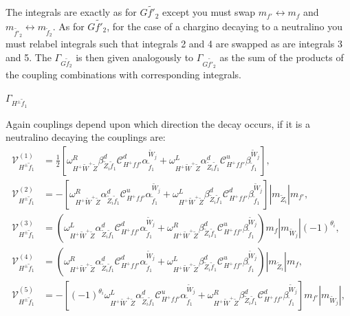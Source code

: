 \documentclass[final,3p,times,pdflatex]{elsarticle}
\begin{document}
The integrals are exactly as for $G \tilde{f'}_2$ except you must swap $m_{f'} \leftrightarrow m_{f}$ and $m_{\tilde{f'}_2} \leftrightarrow m_{\tilde{f}_2}$. As for $G \tilde{f'}_2$, for the case of a chargino decaying to a neutralino you must relabel integrals such that integrals 2 and 4 are swapped as are integrals 3 and 5.
The $\Gamma_{G \tilde{f}_2}$ is then given analogously to $\Gamma_{G \tilde{f'}_2}$ as the sum of the products of the coupling combinations with corresponding integrals.

\textbf{\underline{$\Gamma_{H^{\pm} \tilde{f}_1}$}}

Again couplings depend upon which direction the decay occurs, if it is a neutralino decaying the couplings are:
\begin{align}
\mathcal{V}_{H^{\pm} \tilde{f}_1}^{(1)} &= \frac{1}{2}[\omega_{H^+ \tilde{W}^+ \tilde{Z}}^R \beta_{\tilde{Z}_i \tilde{f}_1}^{d} \mathcal{C}_{H^+ f f'}^d \alpha_{\tilde{f}_1}^{\tilde{W}_j} + \omega_{H^+ \tilde{W}^+ \tilde{Z}}^L \alpha_{\tilde{Z}_i \tilde{f}_1}^{d} \mathcal{C}_{H^+ f f'}^u \beta_{\tilde{f}_1}^{\tilde{W}_j}], \\
\mathcal{V}_{H^{\pm} \tilde{f}_1}^{(2)} &= -[\omega_{H^+ \tilde{W}^+ \tilde{Z}}^R \alpha_{\tilde{Z}_i \tilde{f}_1}^{d} \mathcal{C}_{H^+ f f'}^u \alpha_{\tilde{f}_1}^{\tilde{W}_j} + \omega_{H^+ \tilde{W}^+ \tilde{Z}}^L \beta_{\tilde{Z}_i \tilde{f}_1}^{d} \mathcal{C}_{H^+ f f'}^d \beta_{\tilde{f}_1}^{\tilde{W}_j}]|m_{\tilde{Z}_i}|m_{f'}, \\
\mathcal{V}_{H^{\pm} \tilde{f}_1}^{(3)} &= (\omega_{H^+ \tilde{W}^+ \tilde{Z}}^L \alpha_{\tilde{Z}_i \tilde{f}_1}^{d}  \mathcal{C}_{H^+ f f'}^d \alpha_{\tilde{f}_1}^{\tilde{W}_j} + \omega_{H^+ \tilde{W}^+ \tilde{Z}}^R \beta_{\tilde{Z}_i \tilde{f}_1}^{d} \mathcal{C}_{H^+ f f'}^u \beta_{\tilde{f}_1}^{\tilde{W}_j})m_{f}|m_{\tilde{W}_j}|(-1)^{\theta_i}, \\
\mathcal{V}_{H^{\pm} \tilde{f}_1}^{(4)} &= (\omega_{H^+ \tilde{W}^+ \tilde{Z}}^R \alpha_{\tilde{Z}_i \tilde{f}_1}^{d} \mathcal{C}_{H^+ f f'}^d \alpha_{\tilde{f}_1}^{\tilde{W}_j} + \omega_{H^+ \tilde{W}^+ \tilde{Z}}^L \beta_{\tilde{Z}_i \tilde{f}_1}^{d} \mathcal{C}_{H^+ f f'}^u \beta_{\tilde{f}_1}^{\tilde{W}_j})|m_{\tilde{Z}_i}|m_{f}, \\
\mathcal{V}_{H^{\pm} \tilde{f}_1}^{(5)} &= -[(-1)^{\theta_i}\omega_{H^+ \tilde{W}^+ \tilde{Z}}^L \alpha_{\tilde{Z}_i \tilde{f}_1}^{d} \mathcal{C}_{H^+ f f'}^u \alpha_{\tilde{f}_1}^{\tilde{W}_j} + \omega_{H^+ \tilde{W}^+ \tilde{Z}}^R \beta_{\tilde{Z}_i \tilde{f}_1}^{d} \mathcal{C}_{H^+ f f'}^d \beta_{\tilde{f}_1}^{\tilde{W}_j}]m_{f'}|m_{\tilde{W}_j}|, \\

\end{align}
\end{document}
